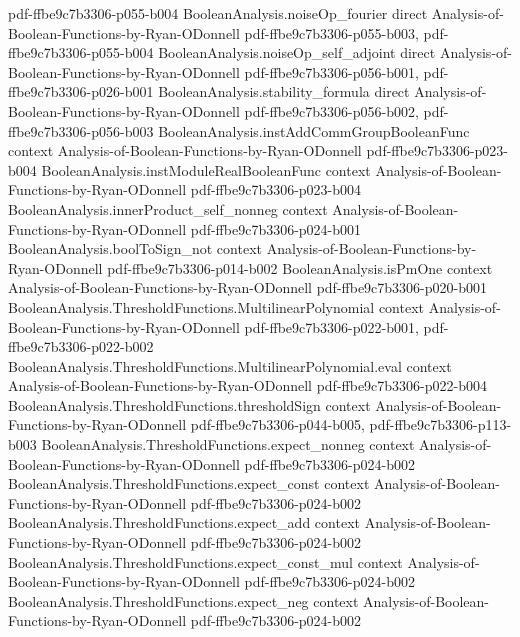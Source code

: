 \begin{theorem}
{    pdf-ffbe9c7b3306-p055-b004}
\proofstep
  {BooleanAnalysis.noiseOp_fourier}
  {direct}
  {Analysis-of-Boolean-Functions-by-Ryan-ODonnell}
  {pdf-ffbe9c7b3306-p055-b003,
    pdf-ffbe9c7b3306-p055-b004}
\proofstep
  {BooleanAnalysis.noiseOp_self_adjoint}
  {direct}
  {Analysis-of-Boolean-Functions-by-Ryan-ODonnell}
  {pdf-ffbe9c7b3306-p056-b001,
    pdf-ffbe9c7b3306-p026-b001}
\proofstep
  {BooleanAnalysis.stability_formula}
  {direct}
  {Analysis-of-Boolean-Functions-by-Ryan-ODonnell}
  {pdf-ffbe9c7b3306-p056-b002,
    pdf-ffbe9c7b3306-p056-b003}
\proofstep
  {BooleanAnalysis.instAddCommGroupBooleanFunc}
  {context}
  {Analysis-of-Boolean-Functions-by-Ryan-ODonnell}
  {pdf-ffbe9c7b3306-p023-b004}
\proofstep
  {BooleanAnalysis.instModuleRealBooleanFunc}
  {context}
  {Analysis-of-Boolean-Functions-by-Ryan-ODonnell}
  {pdf-ffbe9c7b3306-p023-b004}
\proofstep
  {BooleanAnalysis.innerProduct_self_nonneg}
  {context}
  {Analysis-of-Boolean-Functions-by-Ryan-ODonnell}
  {pdf-ffbe9c7b3306-p024-b001}
\proofstep
  {BooleanAnalysis.boolToSign_not}
  {context}
  {Analysis-of-Boolean-Functions-by-Ryan-ODonnell}
  {pdf-ffbe9c7b3306-p014-b002}
\proofstep
  {BooleanAnalysis.isPmOne}
  {context}
  {Analysis-of-Boolean-Functions-by-Ryan-ODonnell}
  {pdf-ffbe9c7b3306-p020-b001}
\proofstep
  {BooleanAnalysis.ThresholdFunctions.MultilinearPolynomial}
  {context}
  {Analysis-of-Boolean-Functions-by-Ryan-ODonnell}
  {pdf-ffbe9c7b3306-p022-b001,
    pdf-ffbe9c7b3306-p022-b002}
\proofstep
  {BooleanAnalysis.ThresholdFunctions.MultilinearPolynomial.eval}
  {context}
  {Analysis-of-Boolean-Functions-by-Ryan-ODonnell}
  {pdf-ffbe9c7b3306-p022-b004}
\proofstep
  {BooleanAnalysis.ThresholdFunctions.thresholdSign}
  {context}
  {Analysis-of-Boolean-Functions-by-Ryan-ODonnell}
  {pdf-ffbe9c7b3306-p044-b005,
    pdf-ffbe9c7b3306-p113-b003}
\proofstep
  {BooleanAnalysis.ThresholdFunctions.expect_nonneg}
  {context}
  {Analysis-of-Boolean-Functions-by-Ryan-ODonnell}
  {pdf-ffbe9c7b3306-p024-b002}
\proofstep
  {BooleanAnalysis.ThresholdFunctions.expect_const}
  {context}
  {Analysis-of-Boolean-Functions-by-Ryan-ODonnell}
  {pdf-ffbe9c7b3306-p024-b002}
\proofstep
  {BooleanAnalysis.ThresholdFunctions.expect_add}
  {context}
  {Analysis-of-Boolean-Functions-by-Ryan-ODonnell}
  {pdf-ffbe9c7b3306-p024-b002}
\proofstep
  {BooleanAnalysis.ThresholdFunctions.expect_const_mul}
  {context}
  {Analysis-of-Boolean-Functions-by-Ryan-ODonnell}
  {pdf-ffbe9c7b3306-p024-b002}
\proofstep
  {BooleanAnalysis.ThresholdFunctions.expect_neg}
  {context}
  {Analysis-of-Boolean-Functions-by-Ryan-ODonnell}
  {pdf-ffbe9c7b3306-p024-b002}

\end{theorem}
